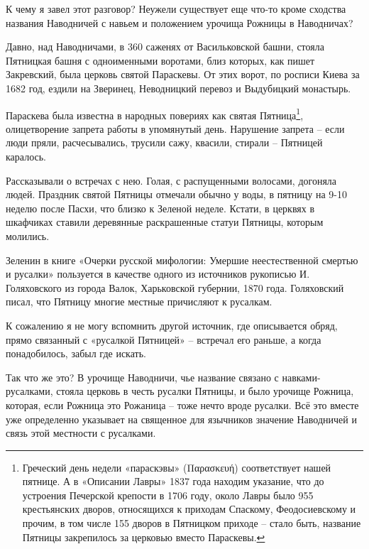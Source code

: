 К чему я завел этот разговор? Неужели существует еще что-то кроме сходства названия Наводничей с навьем и положением урочища Рожницы в Наводничах?

Давно, над Наводничами, в 360 саженях от Васильковской башни, стояла Пятницкая башня с одноименными воротами, близ которых, как пишет Закревский, была церковь святой Параскевы. От этих ворот, по росписи Киева за 1682 год, ездили на Зверинец, Неводницкий перевоз и Выдубицкий монастырь.

Параскева была известна в народных повериях как святая Пятница\footnote{Греческий день недели «параскэвы» (Παρασκευή) соответствует нашей пятнице. А в «Описании Лавры» 1837 года находим указание, что до устроения Печерской крепости в 1706 году, около Лавры было 955 крестьянских дворов, относящихся к приходам Спаскому, Феодосиевскому и прочим, в том числе 155 дворов в Пятницком приходе – стало быть, название Пятницы закрепилось за церковью вместо Параскевы.}, олицетворение запрета работы в упомянутый день. Нарушение запрета – если люди пряли, расчесывались, трусили сажу, квасили, стирали – Пятницей каралось. 

Рассказывали о встречах с нею. Голая, с распущенными волосами, догоняла людей. Праздник святой Пятницы отмечали обычно у воды, в пятницу на 9-10 неделю после Пасхи, что близко к Зеленой неделе. Кстати, в церквях в шкафчиках ставили деревянные раскрашенные статуи Пятницы, которым молились.

Зеленин в книге «Очерки русской мифологии: Умершие неестественной смертью и русалки»\cite{zeleninrusalki} пользуется в качестве одного из источников рукописью И. Голяховского из города Валок, Харьковской губернии, 1870 года. Голяховский писал, что Пятницу многие местные причисляют к русалкам. 

К сожалению я не могу вспомнить другой источник, где описывается обряд, прямо связанный с «русалкой Пятницей» – встречал его раньше, а когда понадобилось, забыл где искать.

Так что же это? В урочище Наводничи, чье название связано с навками-русалками, стояла церковь в честь русалки Пятницы, и было урочище Рожница, которая, если Рожница это Рожаница – тоже нечто вроде русалки. Всё это вместе уже определенно указывает на священное для язычников значение Наводничей и связь этой местности с русалками.



